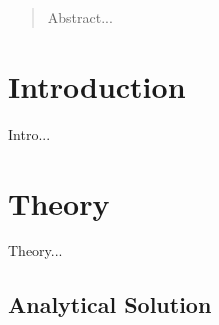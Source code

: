 \documentclass[aps,twocolumn,pre,nofootinbib]{revtex4}
\begin{document}
\begin{abstract}

Abstract... 
  
\end{abstract}


\maketitle



\section{Introduction \label{sec:int}}

Intro...


 

\section{Theory \label{sec:the}}

Theory...


\subsection{Analytical Solution}

\end{document}
